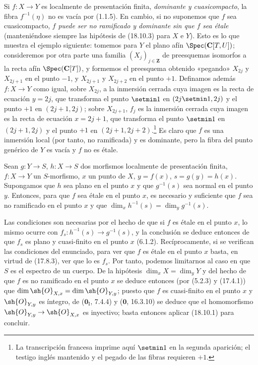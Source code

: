 
\begin{remark}[18.10.3.1]
\label{IV.18.10.3.1}
Si $f:X\to Y$ es localmente de presentación finita, \emph{dominante y cuasicompacto}, la fibra $f^{-1}(\eta)$ no es vacía por (1.1.5). En cambio, si no suponemos que $f$ sea cuasicompacto, \emph{$f$ puede ser no ramificado y dominante sin que $f$ sea étale} (manteniéndose siempre las hipótesis de (18.10.3) para $X$ e $Y$). Esto es lo que muestra el ejemplo siguiente: tomemos para $Y$ el plano afín $\Spec(\mathbf C[T,U])$; consideremos por otra parte una familia $(X_j)_{j\in\mathbf Z}$ de preesquemas isomorfos a la recta afín $\Spec(\mathbf C[T])$, y formemos el preesquema obtenido «pegando» $X_{2j}$ y $X_{2j+1}$ en el punto $-1$, y $X_{2j+1}$ y $X_{2j+2}$ en el punto $+1$. Definamos además $f:X\to Y$ como igual, sobre $X_{2j}$, a la inmersión cerrada cuya imagen es la recta de ecuación $y=2j$, que transforma el punto $\setmin 1$ en $(2j\setmin 1,2j)$ y el punto $+1$ en $(2j+1,2j)$; sobre $X_{2j+1}$, $f_j$ es la inmersión cerrada cuya imagen es la recta de ecuación $x=2j+1$, que transforma el punto $\setmin 1$ en $(2j+1,2j)$ y el punto $+1$ en $(2j+1,2j+2)$.\footnote{La transcripción francesa imprime aquí $\setmin 1$ en la segunda aparición; el testigo inglés mantenido y el pegado de las fibras requieren $+1$.}
Es claro que $f$ es una inmersión local (por tanto, no ramificada) y es dominante, pero la fibra del punto genérico de $Y$ es vacía y $f$ no es étale.
\end{remark}

\begin{corollary}[18.10.4]
\label{IV.18.10.4}
Sean $g:Y\to S$, $h:X\to S$ dos morfismos localmente de presentación finita, $f:X\to Y$ un $S$-morfismo, $x$ un punto de $X$, $y=f(x)$, $s=g(y)=h(x)$. Supongamos que $h$ sea \textup{plano} en el punto $x$ y que $g^{-1}(s)$ sea \textup{normal} en el punto $y$. Entonces, para que $f$ sea étale en el punto $x$, es necesario y suficiente que $f$ sea no ramificado en el punto $x$ y que $\dim_xh^{-1}(s)=\dim_yg^{-1}(s)$.
\end{corollary}

Las condiciones son necesarias por el hecho de que si $f$ es étale en el punto $x$, lo mismo ocurre con $f_s:h^{-1}(s)\to g^{-1}(s)$, y la conclusión se deduce entonces de que $f_s$ es plano y cuasi-finito en el punto $x$ (6.1.2). Recíprocamente, si se verifican las condiciones del enunciado, para ver que $f$ es étale en el punto $x$ basta, en virtud de (17.8.3), ver que lo es $f_s$. Por tanto, podemos limitarnos al caso en que $S$ es el espectro de un cuerpo. De la hipótesis $\dim_xX=\dim_yY$ y del hecho de que $f$ es no ramificado en el punto $x$ se deduce entonces (por (5.2.3) y (17.4.1)) que $\dim\sh{O}_{X,x}=\dim\sh{O}_{Y,y}$; puesto que $f$ es cuasi-finito en el punto $x$ y $\sh{O}_{Y,y}$ es íntegro, de ($\mathbf 0_{\mathrm I}$, 7.4.4) y ($\mathbf 0$, 16.3.10) se deduce que el homomorfismo $\sh{O}_{Y,y}\to\sh{O}_{X,x}$ es inyectivo; basta entonces aplicar (18.10.1) para concluir.

